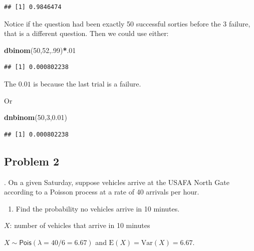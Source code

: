 \documentclass[
]{book}
\newenvironment{Shaded}{\begin{snugshade}}{\end{snugshade}}
\newcommand{\DecValTok}[1]{\textcolor[rgb]{0.00,0.00,0.81}{#1}}
\newcommand{\FloatTok}[1]{\textcolor[rgb]{0.00,0.00,0.81}{#1}}
\newcommand{\KeywordTok}[1]{\textcolor[rgb]{0.13,0.29,0.53}{\textbf{#1}}}
\newcommand{\NormalTok}[1]{#1}
\newcommand{\OperatorTok}[1]{\textcolor[rgb]{0.81,0.36,0.00}{\textbf{#1}}}
\providecommand{\tightlist}{%
  \setlength{\itemsep}{0pt}\setlength{\parskip}{0pt}}
\begin{document}
\begin{verbatim}
## [1] 0.9846474
\end{verbatim}

Notice if the question had been exactly 50 successful sorties before the 3 failure, that is a different question. Then we could use either:

\begin{Shaded}
\begin{Highlighting}[]
\KeywordTok{dbinom}\NormalTok{(}\DecValTok{50}\NormalTok{,}\DecValTok{52}\NormalTok{,.}\DecValTok{99}\NormalTok{)}\OperatorTok{*}\NormalTok{.}\DecValTok{01}
\end{Highlighting}
\end{Shaded}

\begin{verbatim}
## [1] 0.000802238
\end{verbatim}

The \(0.01\) is because the last trial is a failure.

Or

\begin{Shaded}
\begin{Highlighting}[]
\KeywordTok{dnbinom}\NormalTok{(}\DecValTok{50}\NormalTok{,}\DecValTok{3}\NormalTok{,}\FloatTok{0.01}\NormalTok{)}
\end{Highlighting}
\end{Shaded}

\begin{verbatim}
## [1] 0.000802238
\end{verbatim}

\newpage

\hypertarget{problem-2-11}{%
\subsection{Problem 2}\label{problem-2-11}}

. On a given Saturday, suppose vehicles arrive at the USAFA North Gate according to a Poisson process at a rate of 40 arrivals per hour.

\begin{enumerate}
\def\labelenumi{\alph{enumi}.}
\tightlist
\item
  Find the probability no vehicles arrive in 10 minutes.
\end{enumerate}

\(X\): number of vehicles that arrive in 10 minutes

\(X\sim \textsf{Pois}(\lambda=40/6=6.67)\) and \(\mbox{E}(X)=\mbox{Var}(X)=6.67\).
\end{document}
